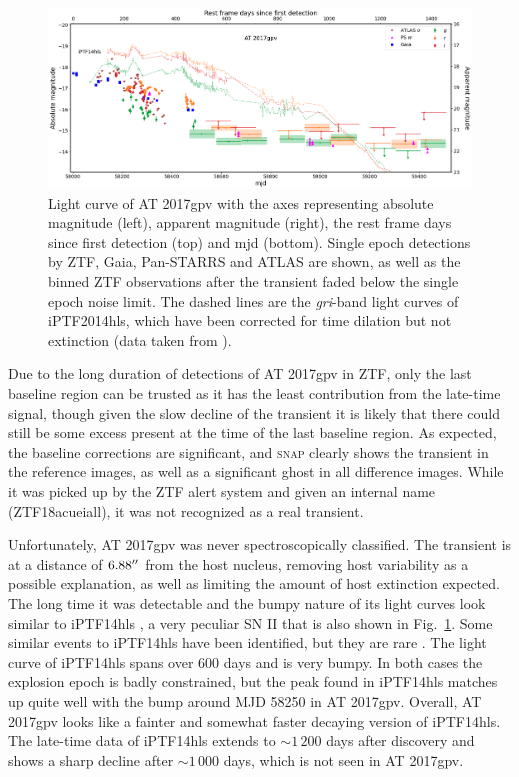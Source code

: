 \documentclass[a4paper,oneside,12pt, class=Latex/Classes/PhDthesisPSnPDF, crop=false]{standalone}
\begin{document}
\begin{figure}
    \centering
    \includegraphics[width=\textwidth]{../Images/chapter_4/17gpv.png}
    \caption{Light curve of AT 2017gpv with the axes representing absolute magnitude (left), apparent magnitude (right), the rest frame days since first detection (top) and mjd (bottom). Single epoch detections by ZTF, Gaia, Pan-STARRS and ATLAS are shown, as well as the binned ZTF observations after the transient faded below the single epoch noise limit. The dashed lines are the \textit{gri}-band light curves of iPTF2014hls, which have been corrected for time dilation but not extinction (data taken from \citealt{iPTF14hls_Iair, Sollerman_2019_iptf14hls}).}
    \label{17gpv_plot}
\end{figure}

Due to the long duration of detections of AT 2017gpv in ZTF, only the last baseline region can be trusted as it has the least contribution from the late-time signal, though given the slow decline of the transient it is likely that there could still be some excess present at the time of the last baseline region. As expected, the baseline corrections are significant, and \textsc{snap} clearly shows the transient in the reference images, as well as a significant ghost in all difference images. While it was picked up by the ZTF alert system and given an internal name (ZTF18acueiall), it was not recognized as a real transient.

Unfortunately, AT 2017gpv was never spectroscopically classified. The transient is at a distance of $6.88^{\prime\prime}$ from the host nucleus, removing host variability as a possible explanation, as well as limiting the amount of host extinction expected. The long time it was detectable and the bumpy nature of its light curves look similar to iPTF14hls \citep{iPTF14hls_Iair, Sollerman_2019_iptf14hls}, a very peculiar SN II that is also shown in Fig.~\ref{17gpv_plot}. Some similar events to iPTF14hls have been identified, but they are rare \citep{Yang_2021_20faa, Soraisam_2022}. The light curve of iPTF14hls spans over 600 days and is very bumpy. In both cases the explosion epoch is badly constrained, but the peak found in iPTF14hls matches up quite well with the bump around MJD 58250 in AT 2017gpv. Overall, AT 2017gpv looks like a fainter and somewhat faster decaying version of iPTF14hls. The late-time data of iPTF14hls \citep{Sollerman_2019_iptf14hls} extends to $\sim1\,200$ days after discovery and shows a sharp decline after $\sim1\,000$ days, which is not seen in AT 2017gpv.\\
\end{document}
